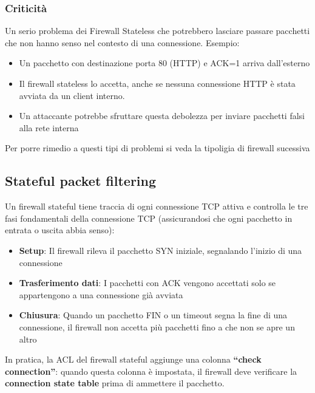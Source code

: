 \subsubsection{Criticità}
Un serio problema dei Firewall Stateless che potrebbero lasciare passare pacchetti che non hanno senso nel contesto di una connessione.
Esempio:
\begin{itemize}
    \item Un pacchetto con destinazione porta 80 (HTTP) e ACK=1 arriva dall'esterno
    \item Il firewall stateless lo accetta, anche se nessuna connessione HTTP è stata avviata da un client interno.
    \item Un attaccante potrebbe sfruttare questa debolezza per inviare pacchetti falsi alla rete interna
\end{itemize}

Per porre rimedio a questi tipi di problemi si veda la tipoligia di firewall sucessiva

\subsection{Stateful packet filtering}
Un firewall stateful tiene traccia di ogni connessione TCP attiva e controlla le tre fasi fondamentali della connessione TCP (assicurandosi che ogni pacchetto in entrata o uscita abbia senso):
\begin{itemize}
    \item \textbf{Setup}: Il firewall rileva il pacchetto SYN iniziale, segnalando l'inizio di una connessione
    \item \textbf{Trasferimento dati}: I pacchetti con ACK vengono accettati solo se appartengono a una connessione già avviata
    \item \textbf{Chiusura}: Quando un pacchetto FIN o un timeout segna la fine di una connessione, il firewall non accetta più pacchetti fino a che non se apre un altro
\end{itemize}

In pratica, la ACL del firewall stateful aggiunge una colonna \textbf{``check connection''}: quando questa colonna è impostata, il firewall deve verificare la \textbf{connection state table} prima di ammettere il pacchetto.


